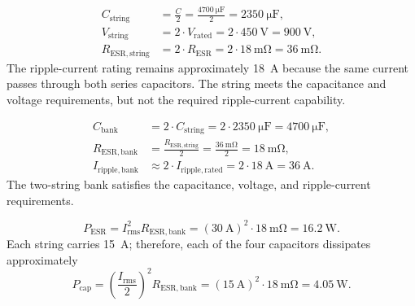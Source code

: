 \begin{solutionblock}
    \begin{align}
        C_\mathrm{string}&=\frac{C}{2}=\frac{\SI{4700}{\micro\farad}}{2}=\SI{2350}{\micro\farad},\\
        V_\mathrm{string}&=2 \cdot V_\mathrm{rated} = 2\cdot\SI{450}{\volt}=\SI{900}{\volt},\\
        R_\mathrm{ESR,string}&=2 \cdot R_\mathrm{ESR} =2\cdot\SI{18}{\milli\ohm}=\SI{36}{\milli\ohm}.
    \end{align}
    The ripple-current rating remains approximately \SI{18}{\ampere} because
    the same current passes through both series capacitors. The string meets the
    capacitance and voltage requirements, but not the required ripple-current capability.
\end{solutionblock}


\begin{solutionblock}
    \begin{align}
        C_\mathrm{bank}&=2 \cdot C_\mathrm{string}=2\cdot\SI{2350}{\micro\farad}
        =\SI{4700}{\micro\farad},\\
        R_\mathrm{ESR,bank}&=\frac{R_\mathrm{ESR,string}}{2}=\frac{\SI{36}{\milli\ohm}}{2}
        =\SI{18}{\milli\ohm},\\
        I_\mathrm{ripple,bank}&\approx 2 \cdot I_\mathrm{ripple,rated} = 2 \cdot \SI{18}{\ampere}
        =\SI{36}{\ampere}.
    \end{align}
    The two-string bank satisfies the capacitance, voltage, and ripple-current requirements.
\end{solutionblock}


\begin{solutionblock}
    \begin{equation}
        P_\mathrm{ESR}=I_\mathrm{rms}^2 R_\mathrm{ESR,bank}
        =(\SI{30}{\ampere})^2\cdot\SI{18}{\milli\ohm}
        =\SI{16.2}{\watt}.
    \end{equation}
    Each string carries \SI{15}{\ampere}; therefore, each of the four capacitors
    dissipates approximately
    \begin{equation}
        P_\mathrm{cap}= (\frac{I_\mathrm{rms}}{2})^2 R_\mathrm{ESR,bank}=(\SI{15}{\ampere})^2\cdot\SI{18}{\milli\ohm}
        =\SI{4.05}{\watt}.
    \end{equation}
\end{solutionblock}

